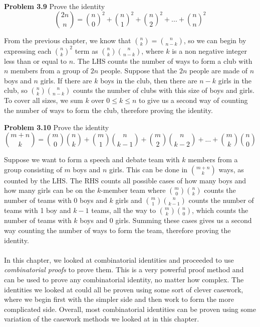 \documentclass[11pt]{scrartcl}
\begin{document}
\\
\begin{tcolorbox}
\textbf{Problem 3.9} Prove the identity 
$${2n \choose n}={n \choose 0}^2+{n \choose 1}^2+{n \choose 2}^2+...+{n \choose n}^2$$
\end{tcolorbox}
\noindent 
From the previous chapter, we know that ${n \choose k}={{n} \choose {n-k}}$, so we can begin by expressing each ${{n \choose k}}^2$ term as ${{n \choose k}{n \choose {n-k}}}$, where $k$ is a non negative integer less than or equal to $n$. The LHS counts the number of ways to form a club with $n$ members from a group of $2n$ people. Suppose that the $2n$ people are made of $n$ boys and $n$ girls. If there are $k$ boys in the club, then there are $n-k$ girls in the club, so ${{n \choose k}{n \choose {n-k}}}$ counts the number of clubs with this size of boys and girls. To cover all sizes, we sum $k$ over $0 \leq k \leq n$ to give us a second way of counting the number of ways to form the club, therefore proving the identity. 
\\
\begin{tcolorbox}
\textbf{Problem 3.10} Prove the identity 
$${m+n \choose k}={m \choose 0}{n \choose k}+{m \choose 1}{n \choose k-1}+{m \choose 2}{n \choose k-2}+...+{m \choose k}{n \choose 0}$$
\end{tcolorbox}
\noindent 
Suppose we want to form a speech and debate team with $k$ members from a group consisting of $m$ boys and $n$ girls. This can be done in ${{{m+n} \choose k}}$ ways, as counted by the LHS. The RHS counts all possible cases of how many boys and how many girls can be on the $k$-member team where ${m \choose 0}{n \choose k}$ counts the number of teams with 0 boys and $k$ girls and ${{m \choose 1}}{n \choose {k-1}}$ counts the number of teams with 1 boy and $k-1$ teams, all the way to ${m \choose k}{n \choose 0}$, which counts the number of teams with $k$ boys and 0 girls. Summing these cases gives us a second way counting the number of ways to form the team, therefore proving the identity. \\
\\
\noindent
In this chapter, we looked at combinatorial identities and proceeded to use \textit{combinatorial proofs} to prove them. This is a very powerful proof method and can be used to prove any combinatorial identity, no matter how complex. The identities we looked at could all be proven using some sort of clever casework, where we begin first with the simpler side and then work to form the more complicated side. Overall, most combinatorial identities can be proven using some variation of the casework methods we looked at in this chapter.  
\end{document}
